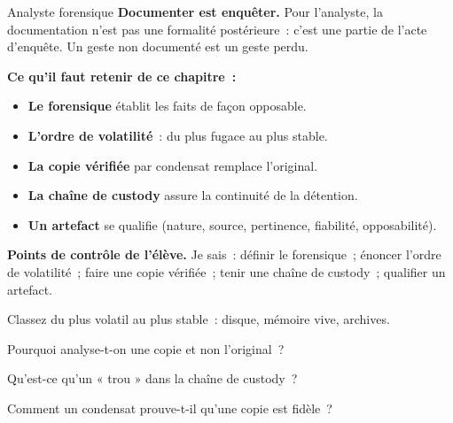 \begin{boxmetier}{Analyste forensique}
\textbf{Documenter est enquêter.} Pour l'analyste, la documentation n'est pas
une formalité postérieure~: c'est une partie de l'acte d'enquête. Un geste
non documenté est un geste perdu.
\end{boxmetier}

\separateur

\begin{boxresume}
\textbf{Ce qu'il faut retenir de ce chapitre~:}
\begin{itemize}
    \item \textbf{Le forensique} établit les faits de façon opposable.
    \item \textbf{L'ordre de volatilité}~: du plus fugace au plus stable.
    \item \textbf{La copie vérifiée} par condensat remplace l'original.
    \item \textbf{La chaîne de custody} assure la continuité de la détention.
    \item \textbf{Un artefact} se qualifie (nature, source, pertinence,
          fiabilité, opposabilité).
\end{itemize}
\end{boxresume}

\begin{boxinfo}
\textbf{Points de contrôle de l'élève.} Je sais~: définir le forensique~;
énoncer l'ordre de volatilité~; faire une copie vérifiée~; tenir une chaîne de
custody~; qualifier un artefact.
\end{boxinfo}

\bigskip

\begin{boxexo}[title={\ding{45}\quad Exercice~11.1. Volatilité \niveaubase}]
Classez du plus volatil au plus stable~: disque, mémoire vive, archives.
\end{boxexo}

\begin{boxexo}[title={\ding{45}\quad Exercice~11.2. Copie \niveaubase}]
Pourquoi analyse-t-on une copie et non l'original~?
\end{boxexo}

\begin{boxexo}[title={\ding{45}\quad Exercice~11.3. Custody \niveaubase}]
Qu'est-ce qu'un « trou » dans la chaîne de custody~?
\end{boxexo}

\begin{boxexo}[title={\ding{45}\quad Exercice~11.4. Condensat \niveaumoyen}]
Comment un condensat prouve-t-il qu'une copie est fidèle~?
\end{boxexo}

